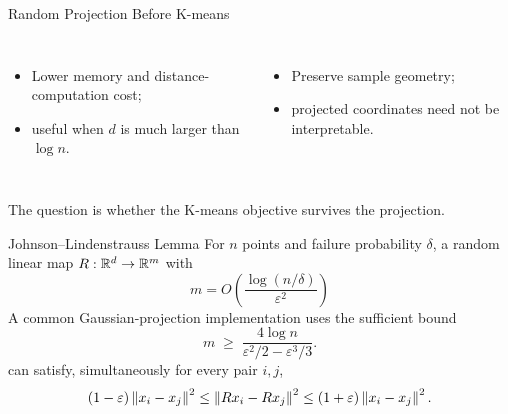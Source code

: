 \begin{frame}{Random Projection Before K-means}
  \centering
  \vspace{.45cm}
  \begin{columns}[T,onlytextwidth]
      \begin{itemize}\spaceditems
        \item Lower memory and distance-computation cost;
        \item useful when $d$ is much larger than $\log n$.
      \end{itemize}
      \begin{itemize}\spaceditems
        \item Preserve sample geometry;
        \item projected coordinates need not be interpretable.
      \end{itemize}
  \end{columns}
  \pause
  \vspace{.2cm}
  \centering
  The question is whether the K-means objective survives the projection.
\end{frame}

\begin{frame}{Johnson--Lindenstrauss Lemma}
  For $n$ points and failure probability $\delta$, a random linear map
  $R:\mathbb R^d\to\mathbb R^m$ with
  \[
    m=O\!\left(\frac{\log(n/\delta)}{\varepsilon^2}\right)
  \]
  A common Gaussian-projection implementation uses the sufficient bound
  \[
    m\;\ge\;\frac{4\log n}{\varepsilon^2/2-\varepsilon^3/3}.
  \]
  can satisfy, simultaneously for every pair $i,j$,
  \[
    (1-\varepsilon)\left\lVert x_i-x_j\right\rVert^2
    \le \left\lVert Rx_i-Rx_j\right\rVert^2
    \le (1+\varepsilon)\left\lVert x_i-x_j\right\rVert^2.
  \]
  \pause
  \vspace{0pt}
\end{frame}

